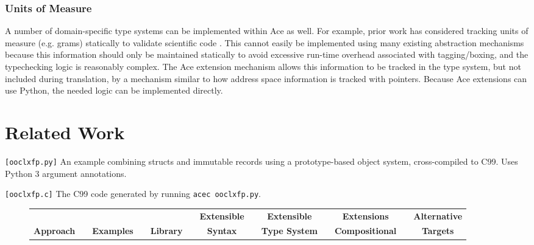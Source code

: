 \documentclass[10pt,preprint]{sigplanconf}
\begin{document}
{\subsubsection{Units of Measure}
A number of domain-specific type systems can be implemented within Ace as well. For example, prior work has considered tracking units of measure (e.g. grams) statically to validate scientific code \cite{conf/cefp/Kennedy09}. This cannot easily be implemented using many existing abstraction mechanisms because this information should only be maintained statically to avoid excessive run-time overhead associated with tagging/boxing, and the typechecking logic is reasonably complex. The Ace extension mechanism allows this information to be tracked in the type system, but not included during translation, by a mechanism similar to how address space information is tracked with pointers. Because Ace extensions can use Python, the needed logic can be implemented directly.

\section{Related Work}\label{related}
\begin{codelisting}[t]

\caption{\texttt{[ooclxfp.py]} An example combining structs and immutable records using a prototype-based object system, cross-compiled to C99. Uses Python 3 argument annotations.}
\label{ooclxfppy}
\end{codelisting}
\begin{codelisting}[t]

\caption{\texttt{[ooclxfp.c]} The C99 code generated by running \texttt{acec ooclxfp.py}.}
\label{ooclxfpc}
\end{codelisting}

%
\begin{figure*}
\vspace{-10pt}
\onecolumn
\begin{longtable}{l l@{}l c@{}c c@{}c c@{}c c@{}c c@{}c}

&&  &&  && {\bfseries Extensible} && {\bfseries Extensible} && {\bfseries Extensions} && {\bfseries Alternative}\\

{\bfseries Approach} && {\bfseries Examples} && {\bfseries Library} && {\bfseries Syntax} && {\bfseries Type System} && {\bfseries Compositional} && {\bfseries Targets}  \\


\end{longtable}
\end{figure*}}
\end{document}
